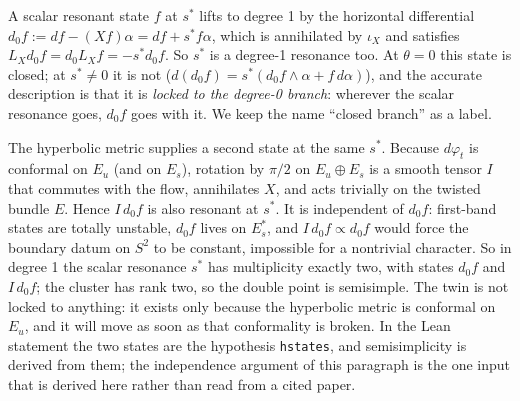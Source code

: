 \documentclass[11pt]{article}
\begin{document}
A scalar resonant state $f$ at $s^*$ lifts to degree 1 by the horizontal differential
$d_0 f := df - (Xf)\alpha = df + s^* f\alpha$, which is annihilated by $\iota_X$ and satisfies
$L_X d_0 f = d_0 L_X f = -s^* d_0 f$. So $s^*$ is a degree-1 resonance too. At $\theta = 0$ this
state is closed; at $s^* \neq 0$ it is not ($d(d_0 f) = s^*(d_0 f\wedge\alpha + f\,d\alpha)$),
and the accurate description is that it is \emph{locked to the degree-0 branch}: wherever the
scalar resonance goes, $d_0 f$ goes with it. We keep the name ``closed branch'' as a label.

The hyperbolic metric supplies a second state at the same $s^*$. Because $d\varphi_t$ is
conformal on $E_u$ (and on $E_s$), rotation by $\pi/2$ on $E_u \oplus E_s$ is a smooth tensor $I$
that commutes with the flow, annihilates $X$, and acts trivially on the twisted bundle $E$. Hence
$I\,d_0 f$ is also resonant at $s^*$. It is independent of $d_0 f$: first-band states are
totally unstable, $d_0 f$ lives on $E_s^*$, and $I\,d_0 f \propto d_0 f$ would force the boundary
datum on $S^2$ to be constant, impossible for a nontrivial character. So in degree 1 the scalar
resonance $s^*$ has multiplicity exactly two, with states $d_0 f$ and $I\,d_0 f$; the cluster
has rank two, so the double point is semisimple. The twin is not locked to anything: it exists
only because the hyperbolic metric is conformal on $E_u$, and it will move as soon as that
conformality is broken. In the Lean statement the two states are the hypothesis
\texttt{hstates}, and semisimplicity is derived from them; the independence argument of this
paragraph is the one input that is derived here rather than read from a cited paper.
\end{document}

